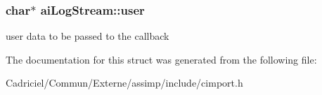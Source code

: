 \subsubsection[{\texorpdfstring{user}{user}}]{\setlength{\rightskip}{0pt plus 5cm}char$\ast$ ai\+Log\+Stream\+::user}\hypertarget{structai_log_stream_a3382042e4171a6dd5a71d7f98741f86e}{}\label{structai_log_stream_a3382042e4171a6dd5a71d7f98741f86e}
user data to be passed to the callback 

The documentation for this struct was generated from the following file\+:\begin{DoxyCompactItemize}
\item 
Cadriciel/\+Commun/\+Externe/assimp/include/cimport.\+h\end{DoxyCompactItemize}
